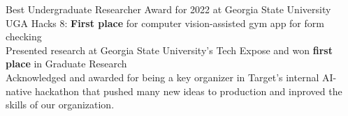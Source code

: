 Best Undergraduate Researcher Award for 2022 at Georgia State University\\
UGA Hacks 8: \textbf{First place} for computer vision-assisted gym app for form checking\\
Presented research at Georgia State University's Tech Expose and won \textbf{first place} in Graduate Research\\
Acknowledged and awarded for being a key organizer in Target's internal AI-native hackathon that pushed many new ideas to production and inproved the skills of our organization. 

